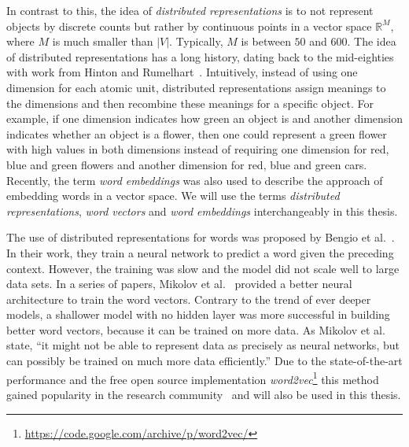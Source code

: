 \documentclass[
        a4paper,
        titlepage,
        twoside,
        parskip
        ]{scrbook}
\theoremstyle{break}
\begin{document}
In contrast to this, the idea of \emph{distributed representations} is to not represent objects by discrete counts but rather by continuous points in a vector space $\mathbb{R}^M$, where $M$ is much smaller than $|V|$.
Typically, $M$ is between $50$ and $600$.
The idea of distributed representations has a long history, dating back to the mid-eighties with work from Hinton and Rumelhart~\cite{Hinton1986,Rumelhart1988}.
Intuitively, instead of using one dimension for each atomic unit, distributed representations assign meanings to the dimensions and then recombine these meanings for a specific object.
For example, if one dimension indicates how green an object is and another dimension indicates whether an object is a flower, then one could represent a green flower with high values in both dimensions instead of requiring one dimension for red, blue and green flowers and another dimension for red, blue and green cars.
Recently, the term \emph{word embeddings} was also used to describe the approach of embedding words in a vector space.
We will use the terms \emph{distributed representations}, \emph{word vectors} and \emph{word embeddings} interchangeably in this thesis.

The use of distributed representations for words was proposed by Bengio et al.~\cite{Bengio2003}.
In their work, they train a neural network to predict a word given the preceding context.
However, the training was slow and the model did not scale well to large data sets.
In a series of papers, Mikolov et al.~\cite{Mikolov2013b,Mikolov2013,Mikolov2013a} provided a better neural architecture to train the word vectors.
Contrary to the trend of ever deeper models, a shallower model with no hidden layer was more successful in building better word vectors, because it can be trained on more data.
As Mikolov et al.~\cite{Mikolov2013a} state, ``it might not be able to represent data as precisely as neural networks, but can possibly be trained on much more data efficiently.''
Due to the state-of-the-art performance and the free open source implementation \emph{word2vec}\footnote{\url{https://code.google.com/archive/p/word2vec/}} this method gained popularity in the research community~\cite{Baroni2014,Goth2016,Navigli2015} and will also be used in this thesis.

\end{document}
